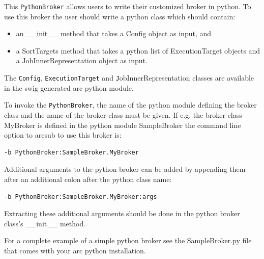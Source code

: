\documentclass{book}
\newcommand{\Config}{\texttt{Config}}
\newcommand{\PythonBroker}{\texttt{PythonBroker}}
\newcommand{\ExecutionTarget}{\texttt{ExecutionTarget}}
\begin{document}
This {\PythonBroker} allows users to write their customized broker in
python. To use this broker the user should write a python class which
should contain:

\begin{itemize}

\item{an \_\_init\_\_ method that takes a Config object as input, and}
\item{a SortTargets method that takes a python list of ExecutionTarget
  objects and a JobInnerRepresentation object as input.}

\end{itemize}

The {\Config}, {\ExecutionTarget} and {\texttt JobInnerRepresentation} classes are
available in the swig generated arc python module.

To invoke the {\PythonBroker}, the name of the python module defining
the broker class and the name of the broker class must be given. If
e.g. the broker class MyBroker is defined in the python module
SampleBroker the command line option to arcsub to use this broker is:

\begin{shaded}
\begin{verbatim}
-b PythonBroker:SampleBroker.MyBroker
\end{verbatim}
\end{shaded}

Additional arguments to the python broker can be added by appending
them after an additional colon after the python class name:

\begin{shaded}
\begin{verbatim}
-b PythonBroker:SampleBroker.MyBroker:args
\end{verbatim}
\end{shaded}

Extracting these additional arguments should be done in the python
broker class's \_\_init\_\_ method.

For a complete example of a simple python broker see the
SampleBroker.py file that comes with your arc python installation.
\end{document}
